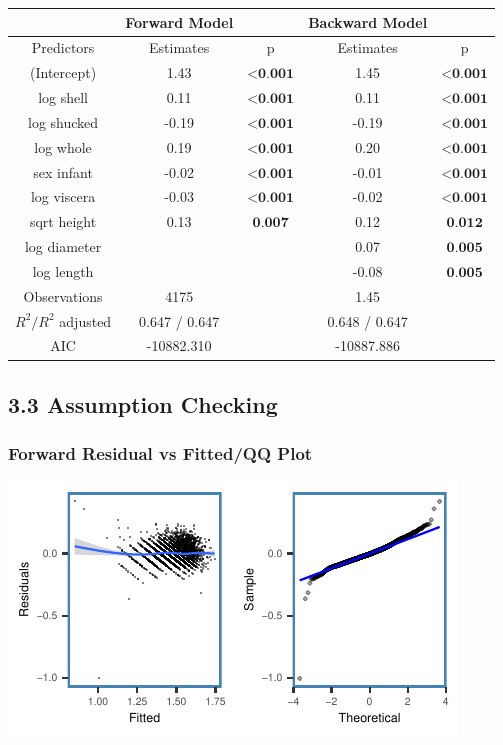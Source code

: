 \documentclass[letterpaper,9pt,twocolumn,twoside,]{pinp}
\begin{document}
\begin{center}
\begin{tabular}{c c c c c}
    & Forward Model & & Backward Model & \\
    \hline
    Predictors & Estimates & p & Estimates & p\\
    \hline
    (Intercept) & 1.43 & $\textbf{<0.001}$ & 1.45 & $\textbf{<0.001}$\\
    log shell & 0.11 & $\textbf{<0.001}$ & 0.11 & $\textbf{<0.001}$\\
    log shucked & -0.19 & $\textbf{<0.001}$ & -0.19 & $\textbf{<0.001}$\\
    log whole & 0.19 & $\textbf{<0.001}$ & 0.20 & $\textbf{<0.001}$\\
    sex infant & -0.02 & $\textbf{<0.001}$ & -0.01 & $\textbf{<0.001}$\\
    log viscera & -0.03 & $\textbf{<0.001}$ & -0.02 & $\textbf{<0.001}$\\
    sqrt height & 0.13 & $\textbf{0.007}$ & 0.12 & $\textbf{0.012}$\\
    log diameter &  & & 0.07 & $\textbf{0.005}$\\
    log length &  & & -0.08 & $\textbf{0.005}$\\
    \hline
    Observations & 4175 &  & 1.45 & \\
    $R^2/R^2$ adjusted & 0.647 / 0.647 & & 0.648 / 0.647 & \\
    AIC & -10882.310 & & -10887.886 & \\
\end{tabular}
\end{center}

\newpage

\hypertarget{assumption-checking}{%
\subsection{3.3 Assumption Checking}\label{assumption-checking}}

\hypertarget{forward-residual-vs-fittedqq-plot}{%
\subsubsection{Forward Residual vs Fitted/QQ
Plot}\label{forward-residual-vs-fittedqq-plot}}

\begin{center}\includegraphics{ExecSum_files/figure-latex/unnamed-chunk-4-1} \end{center}
\end{document}

